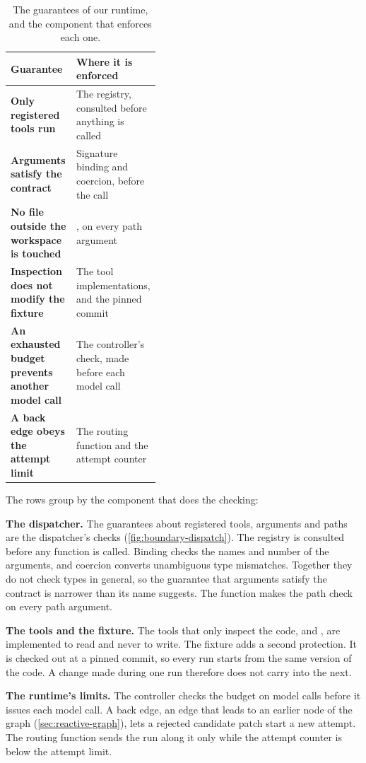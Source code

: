 \begin{table}[!htbp]
  \centering
  \caption{The guarantees of our runtime, and the component that enforces each one.}
  \label{tab:boundary-guarantees}
  \begin{adjustbox}{width=\linewidth}\begin{tabularx}{\linewidth}{@{}XL{0.42\linewidth}@{}}
    \toprule
    \textbf{Guarantee} & \textbf{Where it is enforced} \\
    \midrule
    \textbf{Only registered tools run} & The registry, consulted before anything is called \\
    \textbf{Arguments satisfy the contract} & Signature binding and coercion, before the call \\
    \textbf{No file outside the workspace is touched} & , on every path
      argument \\
    \textbf{Inspection does not modify the fixture} & The tool implementations, and the pinned
      commit \\
    \textbf{An exhausted budget prevents another model call} & The controller's check, made before
      each model call \\
    \textbf{A back edge obeys the attempt limit} & The routing function and the attempt counter \\
    \bottomrule
  \end{tabularx}\end{adjustbox}
\end{table}

The rows group by the component that does the checking:
\bi
\item \textbf{The dispatcher.} The guarantees about registered tools, arguments and paths are the
dispatcher's checks (\cref{fig:boundary-dispatch}). The registry is consulted before any function is
called. Binding checks the names and number of the arguments, and coercion converts unambiguous type
mismatches. Together they do not check types in general, so the guarantee that arguments satisfy the
contract is narrower than its name suggests. The function  makes the path
check on every path argument.
\item \textbf{The tools and the fixture.} The tools that only inspect the code, 
and , are implemented to read and never to write. The fixture adds a second
protection. It is checked out at a pinned commit, so every run starts from the same version of the
code. A change made during one run therefore does not carry into the next.
\item \textbf{The runtime's limits.} The controller checks the budget on model calls before it issues
each model call. A back edge, an edge that leads to an earlier node of the graph (\cref{sec:reactive-graph}),
lets a rejected candidate patch start a new attempt. The routing function sends the run along it only
while the attempt counter is below the attempt limit.
\ei

